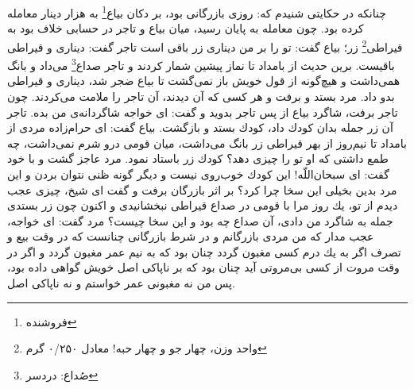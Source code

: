 چنانكه در حكايتى شنيدم كه: روزى بازرگانى بود، بر دكان بياع\footnote{فروشنده}  به هزار دينار معامله كرده بود. چون معامله به پايان رسيد، ميان بياع و تاجر در حسابى خلاف بود به قيراطى\footnote{واحد وزن، چهار جو و چهار حبه! معادل ۰/۲۵۰ گرم}  زر؛ بياع گفت: تو را بر من دينارى زر باقى است تاجر گفت: دينارى و قيراطى باقيست. برين حديث از بامداد تا نماز پيشين شمار كردند و تاجر صداع\footnote{صُداع: دردسر}  مى‌داد و بانگ همى‌داشت و هيچ‌گونه از قول خويش باز نمى‌گشت تا بياع ضجر شد، دينارى و قيراطى بدو داد. مرد بستد و برفت و هر كسى كه آن ديدند، آن تاجر را ملامت مى‌كردند. چون تاجر برفت، شاگرد بياع از پس تاجر بدويد و گفت: اى خواجه شاگردانه‌ی من بده. تاجر آن زر جمله بدان كودك داد، كودك بستد و بازگشت. بياع گفت: اى حرام‌زاده مردى از بامداد تا نيم‌روز از بهر قيراطى زر بانگ مى‌داشت، ميان قومى درو شرم نمى‌داشت، چه طمع داشتى كه او تو را چيزى دهد؟ كودك زر باستاد نمود. مرد عاجز گشت و با خود گفت: اى سبحان‌اللّه! اين كودك خوب‌روى نيست و ديگر گونه ظنى نتوان بردن و اين مرد بدين بخيلى اين سخا چرا كرد؟ بر اثر بازرگان برفت و گفت اى شيخ، چيزى عجب ديدم از تو، يك روز مرا با قومى در صداع قيراطى نبخشانيدى و اكنون چون زر بستدى جمله به شاگرد من دادى، آن صداع چه بود و اين سخا چيست‌؟ مرد گفت: اى خواجه، عجب مدار كه من مردى بازرگانم و در شرط بازرگانى چنانست كه در وقت بيع و تصرف اگر به يك درم كسى مغبون گردد چنان بود كه به نيم عمر مغبون گردد و اگر در وقت مروت از كسى بى‌مروتى آيد چنان بود كه بر ناپاكى اصل خويش گواهى داده بود، پس من نه مغبونى عمر خواستم و نه ناپاكى اصل.

